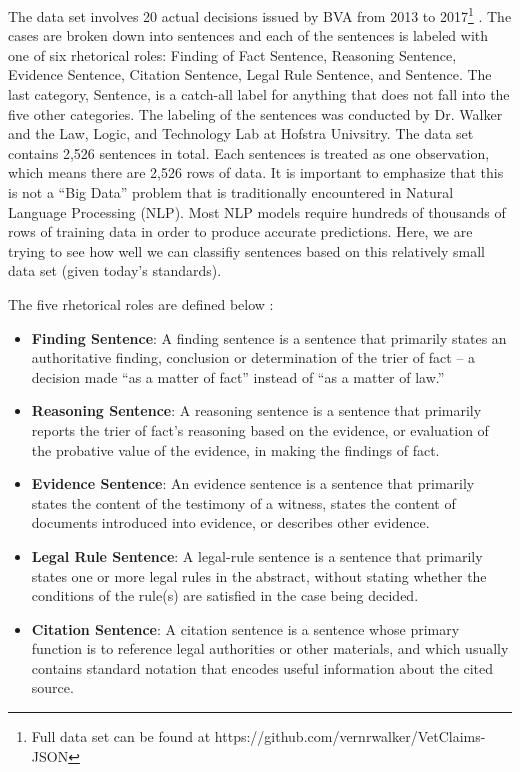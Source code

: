 \documentclass[11pt]{article}
\begin{document}
The data set involves 20 actual decisions issued by BVA from 2013 to 2017\footnote{Full data set can be found at https://github.com/vernrwalker/VetClaims-JSON} \cite{LLTdata}. The cases are broken down into sentences and each of the sentences is labeled with one of six rhetorical roles: Finding of Fact Sentence, Reasoning Sentence, Evidence Sentence, Citation Sentence, Legal Rule Sentence, and Sentence. The last category, Sentence, is a catch-all label for anything that does not fall into the five other categories. The labeling of the sentences was conducted by Dr. Walker and the Law, Logic, and Technology Lab at Hofstra Univsitry. The data set contains 2,526 sentences in total. Each sentences is treated as one observation, which means there are 2,526 rows of data. It is important to emphasize that this is not a ``Big Data'' problem that is traditionally encountered in Natural Language Processing (NLP). Most NLP models require hundreds of thousands of rows of training data in order to produce accurate predictions. Here, we are trying to see how well we can classifiy sentences based on this relatively small data set (given today's standards).

The five rhetorical roles are defined below \cite{LLTdata}:

\begin{itemize}
\item[] \textbf{Finding Sentence}: A finding sentence is a sentence that primarily states an authoritative finding, conclusion or determination of the trier of fact – a decision made “as a matter of fact” instead of “as a matter of law.”
\item[] \textbf{Reasoning Sentence}: A reasoning sentence is a sentence that primarily reports the trier of fact’s reasoning based on the evidence, or evaluation of the probative value of the evidence, in making the findings of fact.
\item[] \textbf{Evidence Sentence}: An evidence sentence is a sentence that primarily states the content of the testimony of a witness, states the content of documents introduced into evidence, or describes other evidence.
\item[] \textbf{Legal Rule Sentence}: A legal-rule sentence is a sentence that primarily states one or more legal rules in the abstract, without stating whether the conditions of the rule(s) are satisfied in the case being decided.
\item[] \textbf{Citation Sentence}: A citation sentence is a sentence whose primary function is to reference legal authorities or other materials, and which usually contains standard notation that encodes useful information about the cited source.
\end{itemize}
\end{document}
